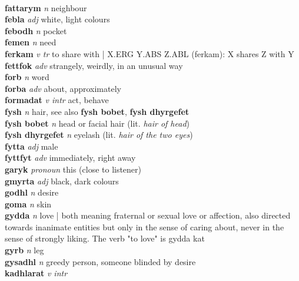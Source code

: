 \\\textbf{fattarym}   \emph{n} \textperiodcentered neighbour\\\textbf{febla}   \emph{adj} \textperiodcentered white, light colours\\\textbf{febodh}   \emph{n} \textperiodcentered pocket\\\textbf{femen}   \emph{n} \textperiodcentered need\\\textbf{ferkam}   \emph{v tr} \textperiodcentered to share with | X.ERG Y.ABS Z.ABL (ferkam): X shares Z with Y\\\textbf{fettfok}   \emph{adv} \textperiodcentered strangely, weirdly, in an unusual way\\\textbf{forb}   \emph{n} \textperiodcentered word\\\textbf{forba}   \emph{adv} \textperiodcentered about, approximately\\\textbf{formadat}   \emph{v intr} \textperiodcentered act, behave\\\textbf{fysh}   \emph{n} \textperiodcentered hair, see also \textbf{fysh bobet}, \textbf{fysh dhyrgefet}\\\textbf{fysh bobet}   \emph{n} \textperiodcentered head or facial hair (lit. \emph{hair of head})\\\textbf{fysh dhyrgefet}   \emph{n} \textperiodcentered eyelash (lit. \emph{hair of the two eyes})\\\textbf{fytta}   \emph{adj} \textperiodcentered male\\\textbf{fyttfyt}   \emph{adv} \textperiodcentered immediately, right away\\\textbf{garyk}   \emph{pronoun} \textperiodcentered this (close to listener)\\\textbf{gmyrta}   \emph{adj} \textperiodcentered black, dark colours\\\textbf{godhl}   \emph{n} \textperiodcentered desire\\\textbf{goma}   \emph{n} \textperiodcentered skin\\\textbf{gydda}   \emph{n} \textperiodcentered love | both meaning fraternal or sexual love or affection, also directed towards inanimate entities but only in the sense of caring about, never in the sense of strongly liking. The verb "to love" is gydda kat\\\textbf{gyrb}   \emph{n} \textperiodcentered leg\\\textbf{gysadhl}   \emph{n} \textperiodcentered greedy person, someone blinded by desire\\\textbf{kadhlarat}   \emph{v intr} \textperiodcentered 